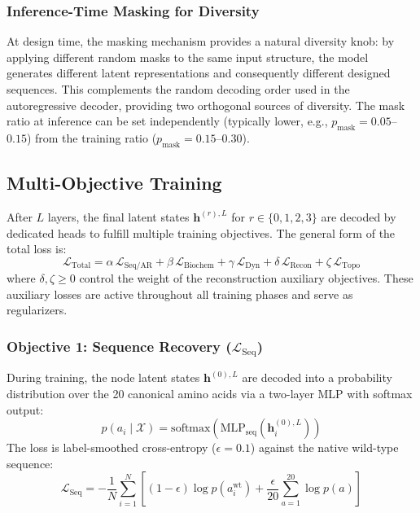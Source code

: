\documentclass{article}
\begin{document}
\subsubsection{Inference-Time Masking for Diversity}

At design time, the masking mechanism provides a natural diversity knob: by applying different random masks to the same input structure, the model generates different latent representations and consequently different designed sequences. This complements the random decoding order used in the autoregressive decoder, providing two orthogonal sources of diversity. The mask ratio at inference can be set independently (typically lower, e.g., $p_{\text{mask}} = 0.05$--$0.15$) from the training ratio ($p_{\text{mask}} = 0.15$--$0.30$).

\subsection{Multi-Objective Training}

After $L$ layers, the final latent states $\mathbf{h}^{(r),L}$ for $r \in \{0, 1, 2, 3\}$ are decoded by dedicated heads to fulfill multiple training objectives. The general form of the total loss is:
\begin{equation}
    \mathcal{L}_{\text{Total}} = \alpha \, \mathcal{L}_{\text{Seq/AR}} + \beta \, \mathcal{L}_{\text{Biochem}} + \gamma \, \mathcal{L}_{\text{Dyn}} + \delta \, \mathcal{L}_{\text{Recon}} + \zeta \, \mathcal{L}_{\text{Topo}}
\end{equation}
where $\delta, \zeta \geq 0$ control the weight of the reconstruction auxiliary objectives. These auxiliary losses are active throughout all training phases and serve as regularizers.

\subsubsection{Objective 1: Sequence Recovery ($\mathcal{L}_{\text{Seq}}$)}

During training, the node latent states $\mathbf{h}^{(0),L}$ are decoded into a probability distribution over the 20 canonical amino acids via a two-layer MLP with softmax output:
\begin{equation}
    p(a_i \mid \mathcal{X}) = \text{softmax}\left(\text{MLP}_{\text{seq}}(\mathbf{h}_i^{(0),L})\right)
\end{equation}
The loss is label-smoothed cross-entropy ($\epsilon = 0.1$) against the native wild-type sequence:
\begin{equation}
    \mathcal{L}_{\text{Seq}} = -\frac{1}{N} \sum_{i=1}^{N} \left[(1 - \epsilon) \log p(a_i^{\text{wt}}) + \frac{\epsilon}{20} \sum_{a=1}^{20} \log p(a)\right]
\end{equation}
\end{document}
